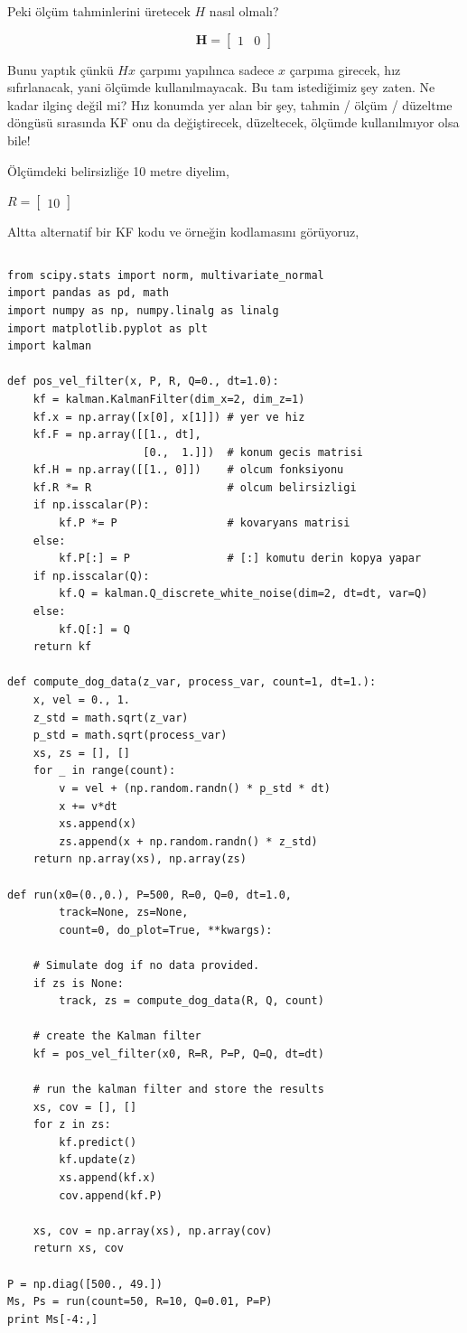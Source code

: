 \documentclass[12pt,fleqn]{article}\usepackage{../../common}
\begin{document}
Peki ölçüm tahminlerini üretecek $H$ nasıl olmalı? 

$$\mathbf H=\begin{bmatrix}1&0\end{bmatrix}$$

Bunu yaptık çünkü $Hx$ çarpımı yapılınca sadece $x$ çarpıma girecek, hız
sıfırlanacak, yani ölçümde kullanılmayacak. Bu tam istediğimiz şey
zaten. Ne kadar ilginç değil mi? Hız konumda yer alan bir şey, tahmin /
ölçüm / düzeltme döngüsü sırasında KF onu da değiştirecek, düzeltecek,
ölçümde kullanılmıyor olsa bile! 

Ölçümdeki belirsizliğe 10 metre diyelim, 

$R = \begin{bmatrix}10\end{bmatrix}$

Altta alternatif bir KF kodu ve örneğin kodlamasını görüyoruz,

\inputminted[fontsize=\footnotesize]{python}{kalman.py}

\begin{verbatim}
from scipy.stats import norm, multivariate_normal
import pandas as pd, math
import numpy as np, numpy.linalg as linalg
import matplotlib.pyplot as plt
import kalman

def pos_vel_filter(x, P, R, Q=0., dt=1.0):    
    kf = kalman.KalmanFilter(dim_x=2, dim_z=1)
    kf.x = np.array([x[0], x[1]]) # yer ve hiz
    kf.F = np.array([[1., dt],
                     [0.,  1.]])  # konum gecis matrisi
    kf.H = np.array([[1., 0]])    # olcum fonksiyonu
    kf.R *= R                     # olcum belirsizligi
    if np.isscalar(P):
        kf.P *= P                 # kovaryans matrisi
    else:
        kf.P[:] = P               # [:] komutu derin kopya yapar
    if np.isscalar(Q):
        kf.Q = kalman.Q_discrete_white_noise(dim=2, dt=dt, var=Q)
    else:
        kf.Q[:] = Q
    return kf

def compute_dog_data(z_var, process_var, count=1, dt=1.):
    x, vel = 0., 1.
    z_std = math.sqrt(z_var) 
    p_std = math.sqrt(process_var)
    xs, zs = [], []
    for _ in range(count):
        v = vel + (np.random.randn() * p_std * dt)
        x += v*dt        
        xs.append(x)
        zs.append(x + np.random.randn() * z_std)        
    return np.array(xs), np.array(zs)

def run(x0=(0.,0.), P=500, R=0, Q=0, dt=1.0, 
        track=None, zs=None,
        count=0, do_plot=True, **kwargs):

    # Simulate dog if no data provided. 
    if zs is None:
        track, zs = compute_dog_data(R, Q, count)

    # create the Kalman filter
    kf = pos_vel_filter(x0, R=R, P=P, Q=Q, dt=dt)  

    # run the kalman filter and store the results
    xs, cov = [], []
    for z in zs:
        kf.predict()
        kf.update(z)
        xs.append(kf.x)
        cov.append(kf.P)

    xs, cov = np.array(xs), np.array(cov)
    return xs, cov

P = np.diag([500., 49.])
Ms, Ps = run(count=50, R=10, Q=0.01, P=P)
print Ms[-4:,]
\end{verbatim}
\end{document}
